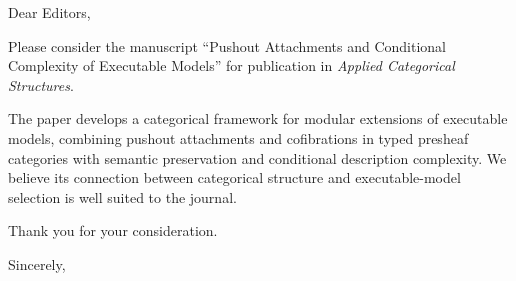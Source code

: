 \documentclass[11pt]{letter}
\date{August 5, 2026}
\begin{document}
\begin{letter}{}

\opening{Dear Editors,}

Please consider the manuscript ``Pushout Attachments and Conditional
Complexity of Executable Models'' for publication in \emph{Applied
Categorical Structures}.

The paper develops a categorical framework for modular extensions of
executable models, combining pushout attachments and cofibrations in typed
presheaf categories with semantic preservation and conditional description
complexity.  We believe its connection between categorical structure and
executable-model selection is well suited to the journal.

Thank you for your consideration.

\closing{Sincerely,}

\end{letter}
\end{document}

